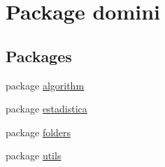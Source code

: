 \hypertarget{namespacedomini}{}\section{Package domini}
\label{namespacedomini}
\subsection*{Packages}
\begin{DoxyCompactItemize}
\item 
package \hyperlink{namespacedomini_1_1algorithm}{algorithm}
\item 
package \hyperlink{namespacedomini_1_1estadistica}{estadistica}
\item 
package \hyperlink{namespacedomini_1_1folders}{folders}
\item 
package \hyperlink{namespacedomini_1_1utils}{utils}
\end{DoxyCompactItemize}
